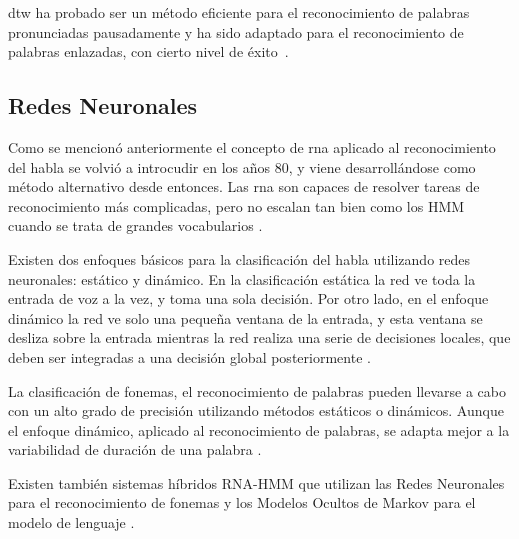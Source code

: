 \gls{dtw} ha probado ser un m\'etodo eficiente para el reconocimiento de palabras pronunciadas 
pausadamente \cite{MyersALevel1981} y ha sido adaptado para el reconocimiento de palabras enlazadas,
con cierto nivel de \mbox{\'exito \cite{MyersALevel1981, SakoeTwoLevel1979, RabinerApplication1980}}.
 
\subsection{Redes Neuronales}
\label{sec:otrosModelosANN}

Como se mencion\'o anteriormente el concepto de \gls{rna} aplicado al reconocimiento
del habla se volvi\'o a introcudir en los a\~nos 80, 
y viene desarroll\'andose como m\'etodo alternativo desde entonces. Las \gls{rna} son capaces de resolver tareas de reconocimiento
m\'as complicadas, pero no escalan tan bien como los HMM cuando se trata de grandes vocabularios \cite{VimalaReview2012}.

Existen dos enfoques b\'asicos para la clasificaci\'on del habla utilizando redes neuronales: est\'atico y din\'amico. En la
clasificaci\'on est\'atica la red ve toda la entrada de voz a la vez, y toma una sola decisi\'on. Por otro lado, en el enfoque
din\'amico la red ve solo una peque\~na ventana de la entrada, y esta ventana se desliza sobre la entrada mientras la red
realiza una serie de decisiones locales, que deben ser integradas a una decisi\'on global posteriormente \cite{TebelskisSpeech1995}.

La clasificaci\'on de fonemas, el reconocimiento de palabras pueden llevarse a cabo con un alto
grado de precisi\'on utilizando m\'etodos est\'aticos o din\'amicos. Aunque el enfoque din\'amico, aplicado al reconocimiento de
palabras, se adapta mejor a la variabilidad de duraci\'on de una palabra \cite{TebelskisSpeech1995}.

Existen tambi\'en sistemas h\'ibridos RNA-HMM que utilizan las Redes Neuronales para el reconocimiento de fonemas y los Modelos
Ocultos de Markov para el modelo de lenguaje \cite{VimalaReview2012}.
